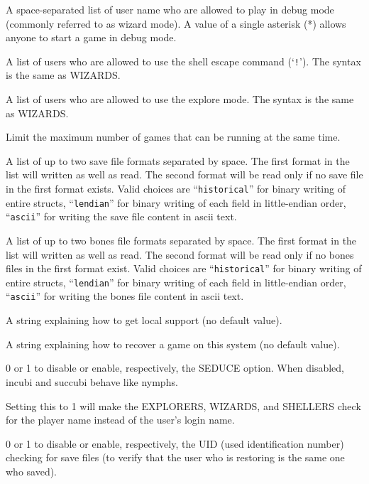 \blist{}
\item[\ib{WIZARDS}]
A space-separated list of user name who are allowed to
play in debug mode (commonly referred to as wizard mode).
A value of a single
asterisk (*) allows anyone to start a game in debug mode.
\item[\ib{SHELLERS}]
A list of users who are allowed to use the shell escape command (`{\tt !}').
The syntax is the same as WIZARDS.
\item[\ib{EXPLORERS}]
A list of users who are allowed to use the explore mode.
The syntax is the same as WIZARDS.
\item[\ib{MAXPLAYERS}]
Limit the maximum number of games that can be running at the same time.
\item[\ib{SAVEFORMAT}]
A list of up to two save file formats separated by space. 
The first format in the list will written as well as read. The second format 
will be read only if no save file in the first format exists.
Valid choices are ``{\tt historical}'' for binary writing of entire structs, 
``{\tt lendian}'' for binary writing of each field in little-endian order,
``{\tt ascii}'' for writing the save file content in ascii text.
\item[\ib{BONESFORMAT}]
A list of up to two bones file formats separated by space. 
The first format in the list will written as well as read. The second
format will be read only if no bones files in the first format exist.
Valid choices are ``{\tt historical}'' for binary writing of entire structs, 
``{\tt lendian}'' for binary writing of each field in little-endian order,
``{\tt ascii}'' for writing the bones file content in ascii text.
\item[\ib{SUPPORT}]
A string explaining how to get local support (no default value).
\item[\ib{RECOVER}]
A string explaining how to recover a game on this system (no default value).
\item[\ib{SEDUCE}]
0 or 1 to disable or enable, respectively, the SEDUCE option.
When disabled, incubi and succubi behave like nymphs.
\item[\ib{CHECK\verb+_+PLNAME}]
Setting this to 1 will make the EXPLORERS, WIZARDS, and SHELLERS check
for the player name instead of the user's login name.
\item[\ib{CHECK\verb+_+SAVE\verb+_+UID}]
0 or 1 to disable or enable, respectively, the UID
(used identification number) checking for save files (to verify that the
user who is restoring is the same one who saved).
\elist

